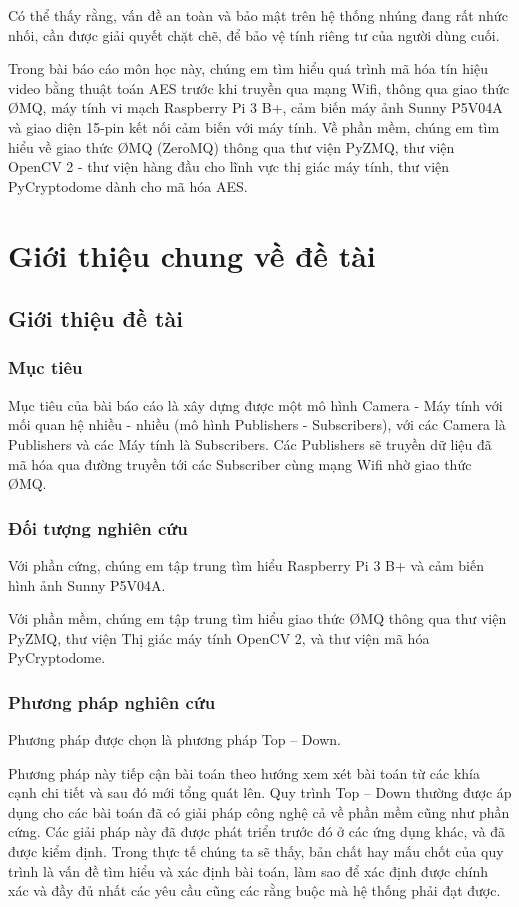 \documentclass{article}
\begin{document}
Có thể thấy rằng, vấn đề an toàn và bảo mật trên hệ thống nhúng đang rất nhức nhối, cần được giải quyết chặt chẽ, để bảo vệ tính riêng tư của người dùng cuối.

Trong bài báo cáo môn học này, chúng em tìm hiểu quá trình mã hóa tín hiệu video bằng thuật toán AES trước khi truyền qua mạng Wifi, thông qua giao thức \O MQ, máy tính vi mạch Raspberry Pi 3 B+, cảm biến máy ảnh Sunny P5V04A và giao diện 15-pin kết nối cảm biến với máy tính. Về phần mềm, chúng em tìm hiểu về giao thức \O MQ (ZeroMQ) thông qua thư viện PyZMQ, thư viện OpenCV 2 - thư viện hàng đầu cho lĩnh vực thị giác máy tính, thư viện PyCryptodome dành cho mã hóa AES.

\newpage

\section{Giới thiệu chung về đề tài}
\subsection{Giới thiệu đề tài}
\subsubsection{Mục tiêu}

Mục tiêu của bài báo cáo là xây dựng được một mô hình Camera - Máy tính với mối quan hệ nhiều - nhiều (mô hình Publishers - Subscribers), với các Camera là Publishers và các Máy tính là Subscribers. Các Publishers sẽ truyền dữ liệu đã mã hóa qua đường truyền tới các Subscriber cùng mạng Wifi nhờ giao thức \O MQ.

\subsubsection{Đối tượng nghiên cứu}
Với phần cứng, chúng em tập trung tìm hiểu Raspberry Pi 3 B+ và cảm biến hình ảnh Sunny P5V04A.
\par
Với phần mềm, chúng em tập trung tìm hiểu giao thức \O MQ thông qua thư viện PyZMQ, thư viện Thị giác máy tính OpenCV 2, và thư viện mã hóa PyCryptodome.
\par
\subsubsection{Phương pháp nghiên cứu}
Phương pháp được chọn là phương pháp Top – Down. 
\par
Phương pháp này tiếp cận bài toán theo hướng xem xét bài toán từ các khía cạnh chi tiết và sau đó mới tổng quát lên. Quy trình Top – Down thường được áp dụng cho các bài toán đã có giải pháp công nghệ cả về phần mềm cũng như phần cứng. Các giải pháp này đã được phát triển trước đó ở các ứng dụng khác, và đã được kiểm định. Trong thực tế chúng ta sẽ thấy, bản chất hay mấu chốt của quy trình là vấn đề tìm hiểu và xác định bài toán, làm sao để xác định được chính xác và đầy đủ nhất các yêu cầu cũng các rằng buộc mà hệ thống phải đạt được.
\par
\end{document}
